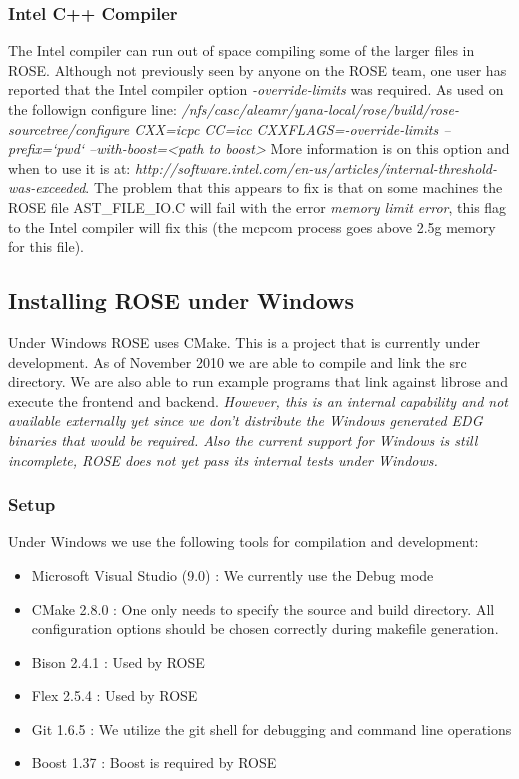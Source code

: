 \subsubsection{Intel C++ Compiler}
The Intel compiler can run out of space compiling some of the larger files in ROSE.
Although not previously seen by anyone on the ROSE team, one user has reported
that the Intel compiler option {\em -override-limits} was required.  As used on
the followign configure line:
{\em /nfs/casc/aleamr/yana-local/rose/build/rose-sourcetree/configure CXX=icpc CC=icc CXXFLAGS=-override-limits --prefix=`pwd` --with-boost=<path to boost>}
More information is on this option and when to use it is at:
{\em http://software.intel.com/en-us/articles/internal-threshold-was-exceeded}.
The problem that this appears to fix is that on some machines the ROSE 
file AST\_FILE\_IO.C will fail with the error {\em memory limit error},
this flag to the Intel compiler will fix this (the mcpcom process goes above 
2.5g memory for this file).


\subsection{Installing ROSE under Windows}
Under Windows ROSE uses CMake. This is a project that is currently under development. As
of November 2010 we are able to compile and link the src directory. We are also able to 
run example programs that link against librose and execute the frontend and backend.
{\em However, this is an internal capability and not available externally yet since we don't
distribute the Windows generated EDG binaries that would be required.  Also the
current support for Windows is still incomplete, ROSE does not yet pass its internal
tests under Windows.}

\subsubsection{Setup}
   Under Windows we use the following tools for compilation and development:

\begin{itemize}
\item Microsoft Visual Studio (9.0) : We currently use the Debug mode
\item CMake 2.8.0 : One only needs to specify the source and build directory. All configuration options should be chosen correctly during makefile generation.
\item Bison 2.4.1 : Used by ROSE
\item Flex 2.5.4 : Used by ROSE
\item Git 1.6.5 : We utilize the git shell for debugging and command line operations
\item Boost 1.37 : Boost is required by ROSE
\end{itemize}


